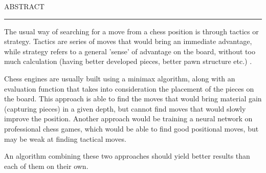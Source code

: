 \documentclass[12pt]{report}
\begin{document}
\newpage
\thispagestyle{empty}
\mbox{}
\newpage
{} 

\cleardoublepage
ABSTRACT
\vspace{0.5cm}	
\hrule
\vspace{0.5cm}	

The usual way of searching for a move from a chess position is through tactics or strategy. Tactics are series of moves that would bring an immediate advantage, while strategy refers to a general 'sense' of advantage on the board, without too much calculation (having better developed pieces, better pawn structure etc.) \cite{klein2022neural}.

Chess engines are usually built using a minimax algorithm, along with an evaluation function that takes into consideration the placement of the pieces on the board. This approach is able to find the moves that would bring material gain (capturing pieces) in a given depth, but cannot find moves that would slowly improve the position. Another approach would be training a neural network on professional chess games, which would be able to find good positional moves, but may be weak at finding tactical moves.

An algorithm combining these two approaches should yield better results than each of them on their own.

\tableofcontents
\newpage
\listoffigures
{}











\end{document}

